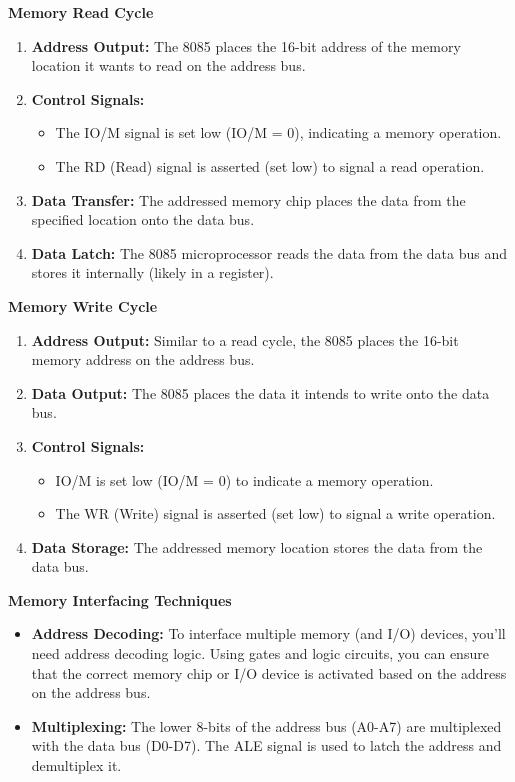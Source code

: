 \documentclass[
]{article}
\begin{document}
\textbf{Memory Read Cycle}

\begin{enumerate}
\def\labelenumi{\arabic{enumi}.}
\item
  \textbf{Address Output:} The 8085 places the 16-bit address of the
  memory location it wants to read on the address bus.
\item
  \textbf{Control Signals:}

  \begin{itemize}
  \item
    The IO/M signal is set low (IO/M = 0), indicating a memory
    operation.
  \item
    The RD (Read) signal is asserted (set low) to signal a read
    operation.
  \end{itemize}
\item
  \textbf{Data Transfer:} The addressed memory chip places the data from
  the specified location onto the data bus.
\item
  \textbf{Data Latch:} The 8085 microprocessor reads the data from the
  data bus and stores it internally (likely in a register).
\end{enumerate}

\textbf{Memory Write Cycle}

\begin{enumerate}
\def\labelenumi{\arabic{enumi}.}
\item
  \textbf{Address Output:} Similar to a read cycle, the 8085 places the
  16-bit memory address on the address bus.
\item
  \textbf{Data Output:} The 8085 places the data it intends to write
  onto the data bus.
\item
  \textbf{Control Signals:}

  \begin{itemize}
  \item
    IO/M is set low (IO/M = 0) to indicate a memory operation.
  \item
    The WR (Write) signal is asserted (set low) to signal a write
    operation.
  \end{itemize}
\item
  \textbf{Data Storage:} The addressed memory location stores the data
  from the data bus.
\end{enumerate}

\textbf{Memory Interfacing Techniques}

\begin{itemize}
\item
  \textbf{Address Decoding:} To interface multiple memory (and I/O)
  devices, you'll need address decoding logic. Using gates and logic
  circuits, you can ensure that the correct memory chip or I/O device is
  activated based on the address on the address bus.
\item
  \textbf{Multiplexing:} The lower 8-bits of the address bus (A0-A7) are
  multiplexed with the data bus (D0-D7). The ALE signal is used to latch
  the address and demultiplex it.
\end{itemize}
\end{document}
